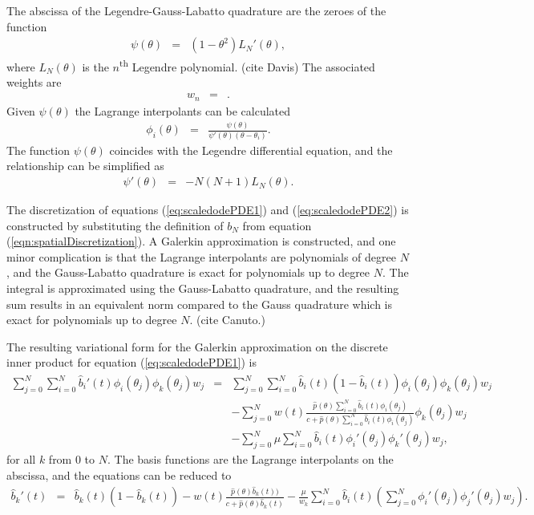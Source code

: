 \documentclass[12pt]{article}
\begin{document}
The abscissa of the Legendre-Gauss-Labatto quadrature are the zeroes
of the function
\begin{eqnarray}
  \psi(\theta) & = & \left(1-\theta^2\right) L_{N}'(\theta),
\end{eqnarray}
where $L_N(\theta)$ is the $n$\textsuperscript{th} Legendre
polynomial. (cite Davis) The associated weights are
\begin{eqnarray}
  w_n & = & .
\end{eqnarray}
Given $\psi(\theta)$ the Lagrange interpolants can be calculated
\begin{eqnarray}
  \phi_i(\theta) & = & \frac{\psi(\theta)}{\psi'(\theta)(\theta-\theta_i)}.
\end{eqnarray}
The function $\psi(\theta)$ coincides with the Legendre differential
equation, and the relationship can be simplified as
\begin{eqnarray}
  \psi'(\theta) & = & -N(N+1)L_N(\theta).
\end{eqnarray}

The discretization of equations (\ref{eq:scaledodePDE1}) and
(\ref{eq:scaledodePDE2}) is constructed by substituting the definition
of $b_N$ from equation (\ref{eqn:spatialDiscretization}). A Galerkin
approximation is constructed, and one minor complication is that the
Lagrange interpolants are polynomials of degree $N$, and the
Gauss-Labatto quadrature is exact for polynomials up to degree
$N$. The integral is approximated using the Gauss-Labatto quadrature,
and the resulting sum results in an equivalent norm compared to the
Gauss quadrature which is exact for polynomials up to degree
$N$. (cite Canuto.)

The resulting variational form for the Galerkin approximation on the
discrete inner product for equation (\ref{eq:scaledodePDE1}) is
\begin{eqnarray}
  \sum_{j=0}^N \sum_{i=0}^N  \hat{b}_i'(t) \phi_i(\theta_j) \phi_k(\theta_j) w_j
  & = &
  \sum_{j=0}^N \sum_{i=0}^N  \hat{b}_i(t) (1 - \hat{b}_i(t) ) \phi_i(\theta_j) \phi_k(\theta_j) w_j \\
  & &  -  \sum_{j=0}^N w(t) \frac{\hat{p}(\theta) \sum_{i=0}^N \hat{b}_i(t) \phi_i(\theta_j) }{c+\hat{p}(\theta) \sum_{i=0}^N \hat{b}_i(t) \phi_i(\theta_j)} \phi_k(\theta_j) w_j \nonumber \\ 
  & & - \sum_{j=0}^N \mu  \sum_{i=0}^N \hat{b}_i(t) \phi_i'(\theta_j) \phi_k'(\theta_j)  w_j, \nonumber
\end{eqnarray}
for all $k$ from $0$ to $N$.  The basis functions are the Lagrange
interpolants on the abscissa, and the equations can be reduced to
\begin{eqnarray}
  \hat{b}_k'(t) 
  & = &
  \hat{b}_k(t) (1 - \hat{b}_k(t) ) -  w(t) \frac{\hat{p}(\theta) \hat{b}_k(t)) }{c+\hat{p}(\theta)  \hat{b}_k(t) }  
   - \frac{\mu}{w_k} \sum_{i=0}^N \hat{b}_i(t) \left( \sum_{j=0}^N  \phi_i'(\theta_j) \phi_j'(\theta_j)  w_j \right). \nonumber
\end{eqnarray}
\end{document}
